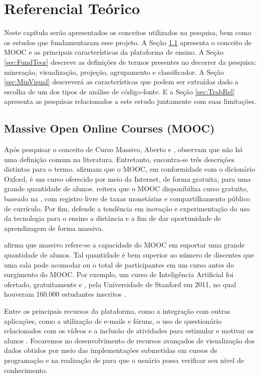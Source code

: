 \chapter{Referencial Teórico}
\label{chap:Ref}
	Neste capítulo serão apresentados os conceitos utilizados na pesquisa, bem como
	os estudos que fundamentaram esse projeto. A Seção \ref{sec:Mooc} apresenta
	o conceito de MOOC e as principais características da plataforma de ensino.
	A Seção \ref{sec:FundTeor} descreve as definições de termos presentes no
	decorrer da pesquisa: mineração, visualização, projeção, agrupamento e
	classificador. A Seção \ref{sec:MinVisual} descreverá as características que
	podem ser extraídas dado a escolha de um dos tipos de análise de código-fonte.
	E a Seção \ref{sec:TrabRel} apresenta as pesquisas relacionados a este estudo
	juntamente com suas limitações.

	\section{Massive Open Online Courses (MOOC)}
	\label{sec:Mooc}
		Após pesquisar o conceito de Curso Massivo, Aberto e ,
		 observam que não há uma definição comum na
		literatura. Entretanto, encontra-se três descrições distintas para o termo.
		 afirmam que o MOOC, em conformidade com o
		dicionário Oxford, é um curso oferecido por meio da Internet, de forma
		gratuita, para uma grande quantidade de alunos. 
		reitera que o MOOC disponibiliza curso gratuito, baseado na ,
		com registro livre de taxas monetárias e compartilhamento público de
		currículo. Por fim,  defende a tendência em inovação e
		experimentação do uso da tecnologia para o ensino a distância e
		 a fim de dar oportunidade de aprendizagem de forma massiva.
		
		 afirma que massivo refere-se a capacidade do MOOC em
		suportar uma grande quantidade de alunos. Tal quantidade é bem superior
		ao número de discentes que uma sala pode acomodar ou o total de
		participantes em um curso  antes do surgimento do MOOC.
		Por exemplo, um curso de Inteligência Artificial foi ofertado, gratuitamente e
		, pela Universidade de Stanford em 2011, no qual houveram
		160.000 estudantes inscritos \cite{rodriguez2012}.
		
		Entre os principais recursos da plataforma, como a integração com outras
		aplicações, como a utilização de e-mails e fóruns, o uso de questionário
		relacionados com os vídeos e a inclusão de atividades para estimular e
		motivar os alunos \cite{fassbinder2014}. Focaremos no desenvolvimento de
		recursos avançados de visualização dos dados obtidos por meio das
		implementações submetidas em cursos de programação e na realização de
		 para que o usuário possa verificar seu nível de conhecimento.

